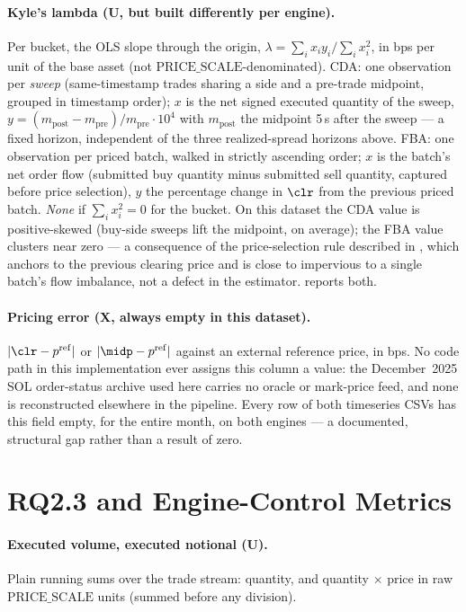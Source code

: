 \paragraph{Kyle's lambda (U, but built differently per engine).} Per
bucket, the OLS slope through the origin, $\lambda = \sum_i x_i
y_i/\sum_i x_i^2$, in bps per unit of the base asset (not
$\mathrm{PRICE\_SCALE}$-denominated). CDA: one observation per
\emph{sweep} (same-timestamp trades sharing a side and a pre-trade
midpoint, grouped in timestamp order); $x$ is the net signed executed
quantity of the sweep, $y = (m_{\mathrm{post}}-m_{\mathrm{pre}})/
m_{\mathrm{pre}} \cdot 10^{4}$ with $m_{\mathrm{post}}$ the midpoint
5\,s after the sweep --- a fixed horizon, independent of the three
realized-spread horizons above. FBA: one observation per priced batch,
walked in strictly ascending order; $x$ is the batch's net order flow
(submitted buy quantity minus submitted sell quantity, captured before
price selection), $y$ the percentage change in $\clr$ from the previous
priced batch. \emph{None} if $\sum_i x_i^2 = 0$ for the bucket. On this
dataset the CDA value is positive-skewed (buy-side sweeps lift the
midpoint, on average); the FBA value clusters near zero --- a
consequence of the price-selection rule described in
, which anchors to the previous clearing price and
is close to impervious to a single batch's flow imbalance, not a defect
in the estimator.  reports both.

\paragraph{Pricing error (X, always empty in this dataset).}
$|\clr - p^{\mathrm{ref}}|$ or $|\midp - p^{\mathrm{ref}}|$ against an
external reference price, in bps. No code path in this implementation ever
assigns this column a value: the December~2025 SOL order-status archive
used here carries no oracle or mark-price feed, and none is
reconstructed elsewhere in the pipeline. Every row of both timeseries
CSVs has this field empty, for the entire month, on both engines --- a
documented, structural gap rather than a result of zero.

\section{RQ2.3 and Engine-Control Metrics}

\paragraph{Executed volume, executed notional (U).} Plain running sums
over the trade stream: quantity, and quantity $\times$ price in raw
$\mathrm{PRICE\_SCALE}$ units (summed before any division).

